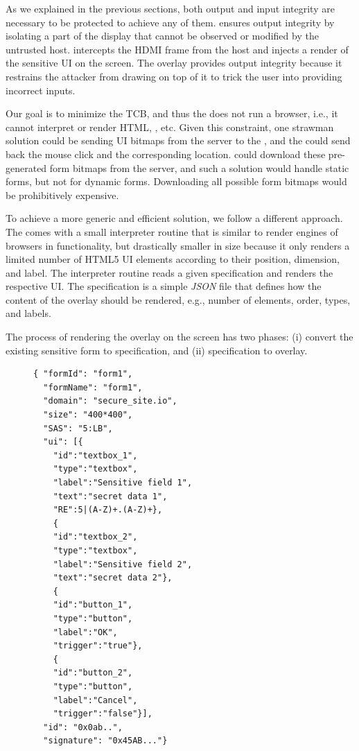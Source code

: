 As we explained in the previous sections, both output and input integrity are necessary to be protected to achieve any of them. \name ensures output integrity by isolating a part of the display that cannot be observed or modified by the untrusted host. \device intercepts the HDMI frame from the host and injects a render of the sensitive UI on the screen. The overlay provides output integrity because it restrains the attacker from drawing on top of it to trick the user into providing incorrect inputs. 

Our goal is to minimize the TCB, and thus the \device does not run a browser, i.e., it cannot interpret or render HTML, \js, etc. Given this constraint, one strawman solution could be sending UI bitmaps from the server to the \device, and the \device could send back the mouse click and the corresponding location. \device could download these pre-generated form bitmaps from the server, and such a solution would handle static forms, but not for dynamic forms. Downloading all possible form bitmaps would be prohibitively expensive.

To achieve a more generic and efficient solution, we follow a different approach. The \device comes with a small interpreter routine that is similar to render engines of browsers in functionality, but drastically smaller in size because it only renders a limited number of HTML5 UI elements according to their position, dimension, and label. The interpreter routine reads a given specification and renders the respective UI. The specification is a simple \emph{JSON} file that defines how the content of the overlay should be rendered, e.g., number of elements, order, types, and labels.  

The process of rendering the overlay on the screen has two phases: (i) convert the existing sensitive form to specification, and (ii) specification to overlay.



\begin{figure}[t]
\begin{lstlisting}[mathescape=true]
{ "formId": "form1", 
  "formName": "form1",
  "domain": "secure_site.io",
  "size": "400*400", 
  "SAS": "5:LB",
  "ui": [{
	"id":"textbox_1",
	"type":"textbox", 
	"label":"Sensitive field 1",
	"text":"secret data 1",
	"RE":5|(A-Z)+.(A-Z)+},
	{
	"id":"textbox_2",
	"type":"textbox",
	"label":"Sensitive field 2",
	"text":"secret data 2"},
	{
	"id":"button_1",
	"type":"button",
	"label":"OK",
	"trigger":"true"},    
	{
	"id":"button_2",
	"type":"button",
	"label":"Cancel",
	"trigger":"false"}],
  "id": "0x0ab..",
  "signature": "0x45AB..."}
\end{lstlisting}

\end{figure}



